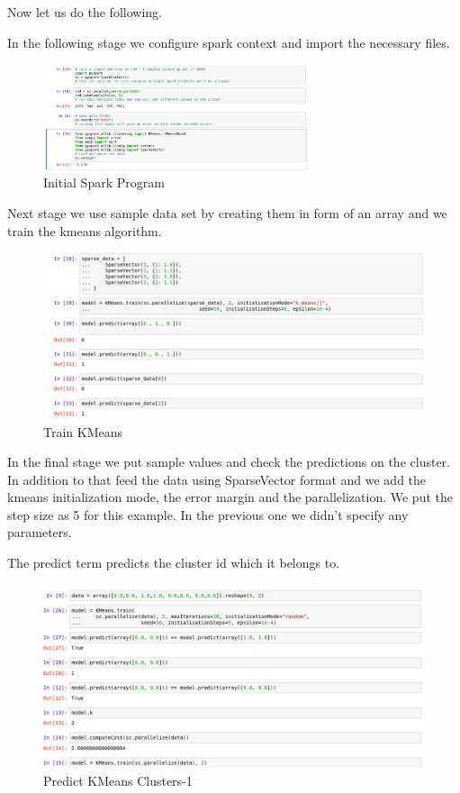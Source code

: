 Now let us do the following.

In the following stage we configure spark context and import the
necessary files.

\begin{figure}[htbp]
\centering
\includegraphics[width=0.7\textwidth]{images/docker-spark-tut-1.png}
\caption{Initial Spark Program}
\end{figure}

Next stage we use sample data set by creating them in form of an array
and we train the kmeans algorithm.

\begin{figure}[htbp]
\centering
\includegraphics[width=1.0\textwidth]{images/docker-spark-tut-4.png}
\caption{Train KMeans}
\end{figure}

In the final stage we put sample values and check the predictions on the
cluster. In addition to that feed the data using SparseVector format and
we add the kmeans initialization mode, the error margin and the
parallelization. We put the step size as 5 for this example. In the
previous one we didn't specify any parameters.

The predict term predicts the cluster id which it belongs to.

\begin{figure}[htbp]
\centering
\includegraphics[width=1.0\textwidth]{images/docker-spark-tut-5.png}
\caption{Predict KMeans Clusters-1}
\end{figure}

